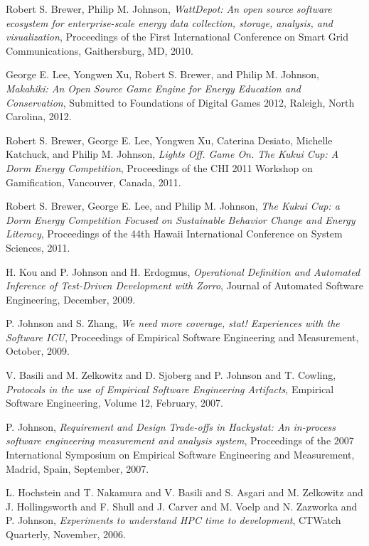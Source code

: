 \begin{Publications: Closely Related}

\item Robert S. Brewer, Philip M. Johnson, 
{\em WattDepot: An open source software ecosystem for enterprise-scale
  energy data collection, storage, analysis, and visualization}, 
Proceedings of the First International Conference on Smart Grid
Communications, Gaithersburg, MD, 2010.

\item George E. Lee, Yongwen Xu, Robert S. Brewer, and Philip
  M. Johnson, {\em Makahiki: An Open Source Game Engine for Energy
    Education and Conservation},
  Submitted to Foundations of Digital Games 2012, Raleigh, North Carolina,
  2012.

\item Robert S. Brewer, George E. Lee, Yongwen Xu, Caterina
  Desiato, Michelle Katchuck, and Philip M. Johnson, 
{\em Lights Off. Game On. The Kukui Cup: A Dorm Energy Competition},
Proceedings of the CHI 2011 Workshop on Gamification, Vancouver, Canada,
2011.

\item Robert S. Brewer, George E. Lee, and Philip M. Johnson, 
{\em The Kukui Cup: a Dorm Energy Competition Focused on Sustainable
  Behavior Change and Energy Literacy}, 
Proceedings of the 44th Hawaii International Conference on System Sciences, 2011.


\end{Publications: Closely Related}


\begin{Publications: Other Significant}

\item H. Kou and P. Johnson and H. Erdogmus, {\em Operational Definition and 
Automated Inference of Test-Driven Development with Zorro}, 
Journal of Automated Software Engineering, December, 2009.

\item P. Johnson and S. Zhang, {\em We need more coverage, stat!  Experiences with the Software ICU}, 
Proceedings of  Empirical Software Engineering and Measurement, October, 2009.
  
\item V. Basili and M. Zelkowitz and D. Sjoberg and P. Johnson and T. Cowling,
{\em Protocols in the use of Empirical Software Engineering Artifacts}, 
Empirical Software Engineering, Volume 12, February, 2007.

\item P. Johnson, {\em Requirement and Design Trade-offs in Hackystat: An
in-process software engineering measurement and analysis system},
Proceedings of the 2007 International Symposium on Empirical Software
Engineering and Measurement, Madrid, Spain, September, 2007.

\item L. Hochstein and T. Nakamura and V. Basili and S. Asgari and 
M. Zelkowitz and J. Hollingsworth and F. Shull and J. Carver and 
M. Voelp and N. Zazworka and P. Johnson, {\em Experiments to 
understand HPC time to development}, CTWatch Quarterly, 
November, 2006.

\end{Publications: Other Significant}


